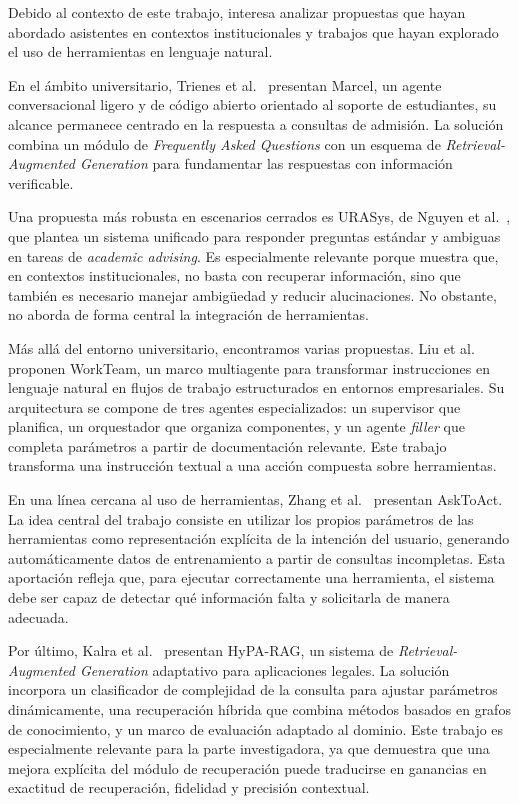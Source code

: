 Debido al contexto de este trabajo, interesa analizar propuestas que hayan abordado asistentes en contextos institucionales y trabajos que hayan explorado el uso de herramientas en lenguaje natural.

En el ámbito universitario, Trienes et al.\ \cite{trienes2025marcel} presentan Marcel, un agente conversacional ligero y de código abierto orientado al soporte de estudiantes, su alcance permanece centrado en la respuesta a consultas de admisión.
La solución combina un módulo de \textit{Frequently Asked Questions} con un esquema de \textit{Retrieval-Augmented Generation} para fundamentar las respuestas con información verificable.

Una propuesta más robusta en escenarios cerrados es URASys, de Nguyen et al.\ \cite{nguyen2025urasys}, que plantea un sistema unificado para responder preguntas estándar y ambiguas en tareas de \textit{academic advising}.
Es especialmente relevante porque muestra que, en contextos institucionales, no basta con recuperar información, sino que también es necesario manejar ambigüedad y reducir alucinaciones. 
No obstante, no aborda de forma central la integración de herramientas.

Más allá del entorno universitario, encontramos varias propuestas. Liu et al.\ \cite{liu2025workteam} proponen WorkTeam, un marco multiagente para transformar instrucciones en lenguaje natural en flujos de trabajo estructurados en entornos empresariales. 
Su arquitectura se compone de tres agentes especializados: un supervisor que planifica, un orquestador que organiza componentes, y un agente \textit{filler} que completa parámetros a partir de documentación relevante. 
Este trabajo transforma una instrucción textual a una acción compuesta sobre herramientas.

En una línea cercana al uso de herramientas, Zhang et al.\ \cite{zhang2025asktoact} presentan AskToAct. 
La idea central del trabajo consiste en utilizar los propios parámetros de las herramientas como representación explícita de la intención del usuario, generando automáticamente datos de entrenamiento a partir de consultas incompletas.
Esta aportación refleja que, para ejecutar correctamente una herramienta, el sistema debe ser capaz de detectar qué información falta y solicitarla de manera adecuada. 

Por último, Kalra et al.\ \cite{kalra2025hyparag} presentan HyPA-RAG, un sistema de \textit{Retrieval-Augmented Generation} adaptativo para aplicaciones legales. 
La solución incorpora un clasificador de complejidad de la consulta para ajustar parámetros dinámicamente, una recuperación híbrida que combina métodos basados en grafos de conocimiento, y un marco de evaluación adaptado al dominio. 
Este trabajo es especialmente relevante para la parte investigadora, ya que demuestra que una mejora explícita del módulo de recuperación puede traducirse en ganancias en exactitud de recuperación, fidelidad y precisión contextual.

